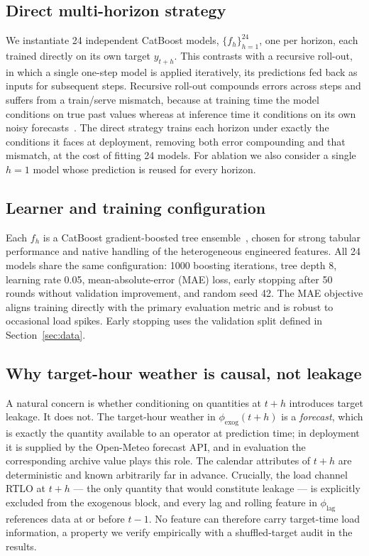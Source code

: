 \subsection{Direct multi-horizon strategy}

We instantiate 24 independent CatBoost models, $\{f_h\}_{h=1}^{24}$, one per
horizon, each trained directly on its own target $y_{t+h}$. This contrasts with a
recursive roll-out, in which a single one-step model is applied iteratively, its
predictions fed back as inputs for subsequent steps. Recursive roll-out compounds
errors across steps and suffers from a train/serve mismatch, because at training
time the model conditions on true past values whereas at inference time it
conditions on its own noisy forecasts~\cite{taieb2016bias}. The direct strategy
trains each horizon under exactly the conditions it faces at deployment, removing
both error compounding and that mismatch, at the cost of fitting 24 models. For
ablation we also consider a single $h{=}1$ model whose prediction is reused for
every horizon.

\subsection{Learner and training configuration}

Each $f_h$ is a CatBoost gradient-boosted tree ensemble~\cite{prokhorenkova2018catboost},
chosen for strong tabular performance and native handling of the heterogeneous
engineered features. All 24 models share the same configuration: 1000 boosting
iterations, tree depth 8, learning rate 0.05, mean-absolute-error (MAE) loss,
early stopping after 50 rounds without validation improvement, and random seed 42.
The MAE objective aligns training directly with the primary evaluation metric and
is robust to occasional load spikes. Early stopping uses the validation split
defined in Section~\ref{sec:data}.

\subsection{Why target-hour weather is causal, not leakage}

A natural concern is whether conditioning on quantities at $t+h$ introduces
target leakage. It does not. The target-hour weather in $\phi_{\mathrm{exog}}(t+h)$
is a \emph{forecast}, which is exactly the quantity available to an operator at
prediction time; in deployment it is supplied by the Open-Meteo forecast API, and
in evaluation the corresponding archive value plays this role. The calendar
attributes of $t+h$ are deterministic and known arbitrarily far in advance.
Crucially, the load channel RTLO at $t+h$ --- the only quantity that would
constitute leakage --- is explicitly excluded from the exogenous block, and every
lag and rolling feature in $\phi_{\mathrm{lag}}$ references data at or before
$t-1$. No feature can therefore carry target-time load information, a property we
verify empirically with a shuffled-target audit in the results.
